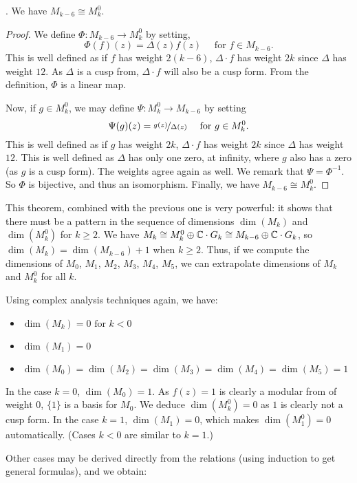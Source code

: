 \begin{theorem}\cite[p.88]{CourseInArithmetic}.
	We have $M_{k-6} \cong M_k^0$.
\end{theorem}
\begin{proof}
    We define $\Phi:M_{k-6} \to M_k^0$ by setting, 
    $$\Phi(f)(z) = \Delta(z)f(z) \quad \text{ for } f \in M_{k-6}.$$
    This is well defined as if $f$ has weight $2(k-6)$, $\Delta \cdot f$ has weight $2k$ since $\Delta$ has weight $12$. As $\Delta$ is a cusp from, $\Delta \cdot f$ will also be a cusp form.
    From the definition, $\Phi$ is a linear map.
    
    Now, if $g \in M_k^0$, we may define $\Psi: M_k^0 \to M_{k-6}$ by setting
    $$\Psi(g)(z) = \nicefrac{g(z)}{\Delta(z)} \quad \text{ for } g \in M_k^0.$$
    This is well defined as if $g$ has weight $2k$, $\Delta \cdot f$ has weight $2k$ since $\Delta$ has weight $12$.
    This is well defined as $\Delta$ has only one zero, at infinity, where $g$ also has a zero (as $g$ is a cusp form). The weights agree again as well.
    We remark that $\Psi = \Phi^{-1}$. So $\Phi$ is bijective, and thus an isomorphism. 
    Finally, we have $M_{k-6} \cong M_k^0$.
\end{proof}
This theorem, combined with the previous one is very powerful: it shows that there must be a pattern in the sequence of dimensions $\dim(M_k)$ and $\dim(M_k^0)$ for $k \geq 2$.
We have $M_k \cong M_k^0 \oplus \mathbb{C} \cdot G_k \cong M_{k-6} \oplus \mathbb{C} \cdot G_k$, so $\dim(M_k) = \dim(M_{k-6})+1$ when $k \geq 2$.
Thus, if we compute the dimensions of $M_0$, $M_1$, $M_2$, $M_3$, $M_4$, $M_5$, we can extrapolate dimensions of $M_k$ and $M_k^0$ for all $k$.

Using complex analysis techniques again, we have:
\begin{itemize}
    \item $\dim(M_k) = 0 \text{ for } k < 0$
    \item $\dim(M_1) = 0$
    \item $\dim(M_0) = \dim(M_2) = \dim(M_3) = \dim(M_4) = \dim(M_5) = 1$
\end{itemize}
In the case $k=0$, $\dim(M_0) = 1$. As $f(z) = 1$ is clearly a modular from of weight $0$, $\{1\}$ is a basis for $M_0$. We deduce $\dim(M_k^0) = 0$ as $1$ is clearly not a cusp form.
In the case $k=1$, $\dim(M_1) = 0$, which makes $\dim(M_1^0) = 0$ automatically.
(Cases $k<0$ are similar to $k=1$.)

Other cases may be derived directly from the relations (using induction to get general formulas), and we obtain:

